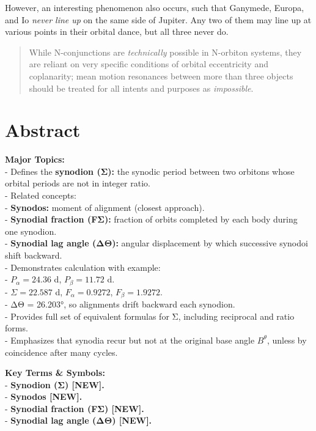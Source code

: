 \documentclass[
  letterpaper,
]{book}
\begin{document}
However, an interesting phenomenon also occurs, such that Ganymede,
Europa, and Io \emph{never line up} on the same side of Jupiter. Any two
of them may line up at various points in their orbital dance, but all
three never do.

\begin{quote}
While N-conjunctions are \emph{technically} possible in N-orbiton
systems, they are reliant on very specific conditions of orbital
eccentricity and coplanarity; mean motion resonances between more than
three objects should be treated for all intents and purposes as
\emph{impossible}.
\end{quote}

\section{Abstract}\label{abstract-33}

\textbf{Major Topics:}\\
- Defines the \textbf{synodion (Σ):} the synodic period between two
orbitons whose orbital periods are not in integer ratio.\\
- Related concepts:\\
- \textbf{Synodos:} moment of alignment (closest approach).\\
- \textbf{Synodial fraction (FΣ):} fraction of orbits completed by each
body during one synodion.\\
- \textbf{Synodial lag angle (ΔΘ):} angular displacement by which
successive synodoi shift backward.\\
- Demonstrates calculation with example:\\
- \(P_\alpha = 24.36\) d, \(P_\beta = 11.72\) d.\\
- \(\Sigma = 22.587\) d, \(F_\alpha = 0.9272\), \(F_\beta = 1.9272\).\\
- ΔΘ = 26.203°, so alignments drift backward each synodion.\\
- Provides full set of equivalent formulas for Σ, including reciprocal
and ratio forms.\\
- Emphasizes that synodia recur but not at the original base angle
\(B^\theta\), unless by coincidence after many cycles.

\textbf{Key Terms \& Symbols:}\\
- \textbf{Synodion (Σ) {[}NEW{]}.}\\
- \textbf{Synodos {[}NEW{]}.}\\
- \textbf{Synodial fraction (FΣ) {[}NEW{]}.}\\
- \textbf{Synodial lag angle (ΔΘ) {[}NEW{]}.}
\end{document}
